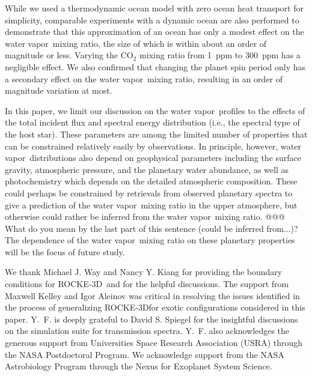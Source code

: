 \documentclass[11pt,numberedappendix,twocolappendix,]{emulateapj}
\def\modelE{ROCKE-3D}
\newcommand{\dsa}[1]{{\color{blue}#1}}
\newcommand{\yf}[1]{{\color{orange}#1}}
\newcommand{\wv}{water vapor\ }
\begin{document}
While we used a thermodynamic ocean model with zero ocean heat transport for simplicity, comparable experiments with a dynamic ocean are also performed to demonstrate that this approximation of an ocean \yf{has only a modest effect} on the \wv mixing ratio, the size of which is within about an order of magnitude \yf{or less}. 
Varying the CO$_2$ mixing ratio from 1~ppm to 300~ppm has a negligible effect. 
We also confirmed that changing the planet spin period only has a secondary effect on the \wv mixing ratio, resulting in an order of magnitude variation at most. 


In this paper, we limit our discussion on the \wv profiles to the effects of the total incident flux and spectral energy distribution (i.e., the spectral type of the host star). 
These parameters are among the limited number of properties that can be constrained relatively easily by observations. 
In principle, however, \wv distributions also depend on geophysical parameters including the surface gravity, atmospheric pressure, \yf{and the planetary water abundance}, as well as photochemistry which depends on the detailed atmospheric composition. 
These could perhaps be constrained by retrievals from observed planetary spectra to give a prediction of the \wv mixing ratio in the upper atmosphere, but otherwise could rather be inferred from the \wv mixing ratio. \dsa{@@@ What do you mean by the last part of this sentence (could be inferred from...)?}
The dependence of the \wv mixing ratio on these planetary properties will be  the focus of future study. 





\acknowledgments
We thank Michael J. Way and Nancy Y. Kiang for providing the boundary conditions for \modelE \ and for the helpful discussions. 
The support from Maxwell Kelley and Igor Aleinov was critical in resolving the issues identified in the process of generalizing \modelE for exotic configurations considered in this paper. 
Y.~F. is deeply grateful to David S. Spiegel for the insightful discussions on the simulation suite for transmission spectra. 
Y.~F. also acknowledges the generous support from Universities Space Research Association (USRA) through the NASA Postdoctoral Program. 
We acknowledge support from the NASA Astrobiology Program through the Nexus for Exoplanet System Science.




\appendix


\end{document}
